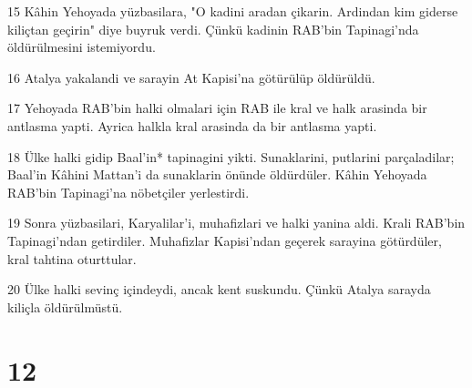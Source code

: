 \par 15 Kâhin Yehoyada yüzbasilara, "O kadini aradan çikarin. Ardindan kim giderse kiliçtan geçirin" diye buyruk verdi. Çünkü kadinin RAB'bin Tapinagi'nda öldürülmesini istemiyordu.
\par 16 Atalya yakalandi ve sarayin At Kapisi'na götürülüp öldürüldü.
\par 17 Yehoyada RAB'bin halki olmalari için RAB ile kral ve halk arasinda bir antlasma yapti. Ayrica halkla kral arasinda da bir antlasma yapti.
\par 18 Ülke halki gidip Baal'in* tapinagini yikti. Sunaklarini, putlarini parçaladilar; Baal'in Kâhini Mattan'i da sunaklarin önünde öldürdüler. Kâhin Yehoyada RAB'bin Tapinagi'na nöbetçiler yerlestirdi.
\par 19 Sonra yüzbasilari, Karyalilar'i, muhafizlari ve halki yanina aldi. Krali RAB'bin Tapinagi'ndan getirdiler. Muhafizlar Kapisi'ndan geçerek sarayina götürdüler, kral tahtina oturttular.
\par 20 Ülke halki sevinç içindeydi, ancak kent suskundu. Çünkü Atalya sarayda kiliçla öldürülmüstü.

\chapter{12}

